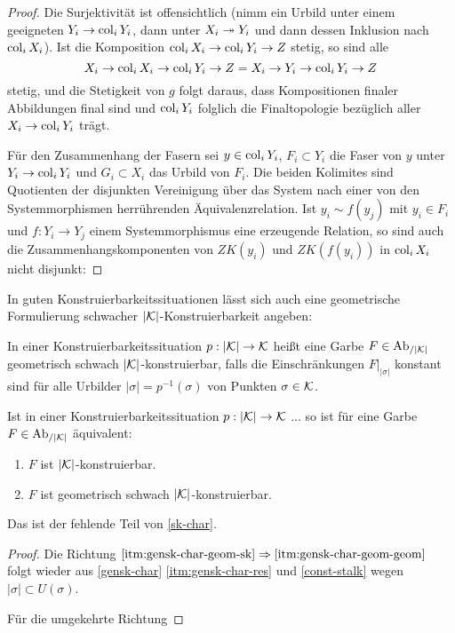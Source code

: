 \begin{proof}
  Die Surjektivität ist offensichtlich (nimm ein Urbild unter einem
  geeigneten $Y_i \to \operatorname{col}_i Y_i$, dann unter $X_i \twoheadrightarrow Y_i$ und dann
  dessen Inklusion nach $\operatorname{col}_i X_i$). Ist die Komposition $\operatorname{col}_i X_i
  \to \operatorname{col}_i Y_i \to Z$ stetig, so sind alle
  \[X_i \to \operatorname{col}_i X_i \to \operatorname{col}_i Y_i \to Z
  = X_i \to Y_i \to \operatorname{col}_i Y_i \to Z \] stetig, und die Stetigkeit von
  $g$ folgt daraus, dass Kompositionen finaler Abbildungen final sind
  und $\operatorname{col}_i Y_i$ folglich die Finaltopologie bezüglich aller $X_i
  \to \operatorname{col}_i Y_i$ trägt.

  Für den Zusammenhang der Fasern sei $y \in \operatorname{col}_i Y_i$, $F_i \subset
  Y_i$ die Faser von $y$ unter $Y_i \to \operatorname{col}_i Y_i$ und $G_i \subset
  X_i$ das Urbild von $F_i$. Die beiden Kolimites sind Quotienten der
  disjunkten Vereinigung über das System nach einer von den
  Systemmorphismen herrührenden Äquivalenzrelation. Ist $y_i \sim
  f(y_j)$ mit $y_i \in F_i$ und $f: Y_i \to Y_j$ einem
  Systemmorphismus eine erzeugende Relation, so sind auch die
  Zusammenhangskomponenten von $ZK(y_i)$ und $ZK(f(y_i))$ in $\operatorname{col}_i
  X_i$ nicht disjunkt:

\end{proof}


In guten Konstruierbarkeitssituationen lässt sich auch eine
geometrische Formulierung schwacher $|\mathcal{K}|$-Konstruierbarkeit angeben:
\begin{defn}
  In einer Konstruierbarkeitssituation $p: |\mathcal{K}| \to \mathcal{K}$ heißt eine
  Garbe $F \in \operatorname{Ab}_{/|\mathcal{K}|}$ geometrisch schwach $|\mathcal{K}|$-konstruierbar, falls
  die Einschränkungen $F|_{|\sigma|}$ konstant sind für alle Urbilder
  $|\sigma| = p^{-1}(\sigma)$ von Punkten $\sigma \in \mathcal{K}$.
\end{defn}
\begin{prop} \label{gensk-char-geom}
  Ist in einer Konstruierbarkeitssituation $p: |\mathcal{K}| \to \mathcal{K}$ ...  so
  ist für eine Garbe $F \in \operatorname{Ab}_{/|\mathcal{K}|}$ äquivalent:
  \begin{enumerate}
    \item \label{itm:gensk-char-geom-sk} $F$ ist $|\mathcal{K}|$-konstruierbar.
    \item \label{itm:gensk-char-geom-geom} $F$ ist geometrisch schwach
      $|\mathcal{K}|$-konstruierbar.
  \end{enumerate}
  \end{prop}
Das ist der fehlende Teil von \ref{sk-char}.
\begin{proof}
  Die Richtung $\ref{itm:gensk-char-geom-sk} \Rightarrow
  \ref{itm:gensk-char-geom-geom}$ folgt wieder aus \ref{gensk-char}
  \ref{itm:gensk-char-res} und \ref{const-stalk} wegen $|\sigma|
  \subset U(\sigma)$.

  Für die umgekehrte Richtung %
\end{proof}


